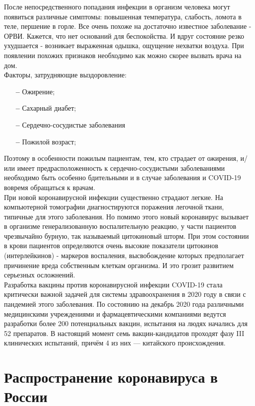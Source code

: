 \documentclass[a4paper, 12pt]{extarticle}
\begin{document}
После непосредственного попадания инфекции в организм человека могут появиться
различные симптомы: повышенная температура, слабость, ломота в теле, першение в горле.
Все очень похоже на достаточно известное заболевание - ОРВИ. Кажется, что нет
оснований для беспокойства. И вдруг состояние резко ухудшается - возникает
выраженная одышка, ощущение нехватки воздуха. При появлении похожих признаков
необходимо как можно скорее вызвать врача на дом.
\\

Факторы, затрудняющие выздоровление:
\begin{itemize}
    \item[\bfseries--] Ожирение;
    \item[\bfseries--] Сахарный диабет;
    \item[\bfseries--] Сердечно-сосудистые заболевания
    \item[\bfseries--] Пожилой возраст;
\end{itemize}

Поэтому в особенности пожилым пациентам, тем, кто страдает от ожирения, и/или имеет
предрасположенность к сердечно-сосудистыми заболеваниями необходимо быть
особенно бдительными и в случае заболевания и COVID-19 вовремя обращаться к
врачам.
\\

При новой коронавирусной инфекции существенно страдают легкие. На компьютерной
томографии диагностируются поражения легочной ткани, типичные для этого
заболевания. Но помимо этого новый коронавирус вызывает в организме
генерализованную воспалительную реакцию, у части пациентов чрезвычайно бурную,
так называемый цитокиновый шторм. При этом состоянии в крови пациентов
определяются очень высокие показатели цитокинов (интерлейкинов) - маркеров
воспаления, высвобождение которых предполагает причинение вреда собственным
клеткам организма. И это грозит развитием серьезных осложнений.
\\

Разработка вакцины против коронавирусной инфекции COVID-19 стала критически
важной задачей для системы здравоохранения в 2020 году в связи с пандемией
этого заболевания. По состоянию на декабрь 2020 года различными медицинскими
учреждениями и фармацевтическими компаниями ведутся разработки более 200
потенциальных вакцин, испытания на людях начались для 52 препаратов. В
настоящий момент семь вакцин-кандидатов проходят фазу III клинических
испытаний, причём 4 из них — китайского происхождения.
\newpage

\section{Распространение коронавируса в России}
\end{document}
